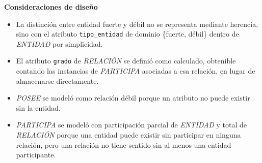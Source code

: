 \textbf{Consideraciones de diseño}

\begin{itemize}
	\item La distinción entre entidad fuerte y débil no se representa mediante herencia, sino con el atributo \texttt{tipo\_entidad} de dominio \{fuerte, débil\} dentro de \textit{ENTIDAD} por simplicidad.
	\item El atributo \texttt{grado} de \textit{RELACIÓN} se definió como calculado, obtenible contando las instancias de \textit{PARTICIPA} asociadas a esa relación, en lugar de almacenarse directamente.
	\item \textit{POSEE} se modeló como relación débil porque un atributo no puede existir sin la entidad.
	\item \textit{PARTICIPA} se modeló con participación parcial de \textit{ENTIDAD} y total de \textit{RELACIÓN} porque una entidad puede existir sin participar en ninguna relación, pero una relación no tiene sentido sin al menos una entidad participante.
\end{itemize}
